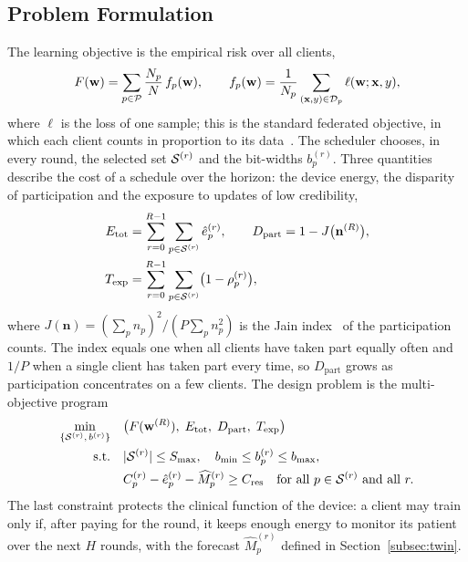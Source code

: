\subsection{Problem Formulation}
\label{subsec:problem}
The learning objective is the empirical risk over all clients,
\begin{equation}
	F(\mathbf{w})=\sum_{p\in\mathcal{P}}\frac{N_p}{N}\,f_p(\mathbf{w}),\qquad f_p(\mathbf{w})=\frac{1}{N_p}\sum_{(\mathbf{x},y)\in\mathcal{D}_p}\ell(\mathbf{w};\mathbf{x},y),
	\label{eq:objective}
\end{equation}
where $\ell$ is the loss of one sample; this is the standard federated objective, in which each client counts in proportion to its data~\cite{mcmahan2017communication,kairouz2021advances}. The scheduler chooses, in every round, the selected set $\mathcal{S}^{(r)}$ and the bit-widths $b_p^{(r)}$. Three quantities describe the cost of a schedule over the horizon: the device energy, the disparity of participation and the exposure to updates of low credibility,
\begin{equation}
	\begin{aligned}
		E_{\mathrm{tot}}&=\sum_{r=0}^{R-1}\sum_{p\in\mathcal{S}^{(r)}}\hat e_p^{(r)}, \qquad D_{\mathrm{part}}=1-J\bigl(\mathbf{n}^{(R)}\bigr),\\
		T_{\mathrm{exp}}&=\sum_{r=0}^{R-1}\sum_{p\in\mathcal{S}^{(r)}}\bigl(1-\rho_p^{(r)}\bigr),
	\end{aligned}
	\label{eq:criteria}
\end{equation}
where $J(\mathbf{n})=(\sum_p n_p)^2/(P\sum_p n_p^2)$ is the Jain index~\cite{jain1984quantitative} of the participation counts. The index equals one when all clients have taken part equally often and $1/P$ when a single client has taken part every time, so $D_{\mathrm{part}}$ grows as participation concentrates on a few clients. The design problem is the multi-objective program
\begin{equation}
	\begin{aligned}
		\min_{\{\mathcal{S}^{(r)},\,b^{(r)}\}}\quad & \bigl(F(\mathbf{w}^{(R)}),\;E_{\mathrm{tot}},\;D_{\mathrm{part}},\;T_{\mathrm{exp}}\bigr)\\
		\text{s.t.}\quad & |\mathcal{S}^{(r)}|\le S_{\max},\quad b_{\min}\le b_p^{(r)}\le b_{\max},\\
		& C_p^{(r)}-\hat e_p^{(r)}-\widehat{M}_p^{(r)}\ge C_{\mathrm{res}}\quad\text{for all } p\in\mathcal{S}^{(r)} \text{ and all } r .
	\end{aligned}
	\label{eq:designproblem}
\end{equation}
The last constraint protects the clinical function of the device: a client may train only if, after paying for the round, it keeps enough energy to monitor its patient over the next $H$ rounds, with the forecast $\widehat{M}_p^{(r)}$ defined in Section~\ref{subsec:twin}.


